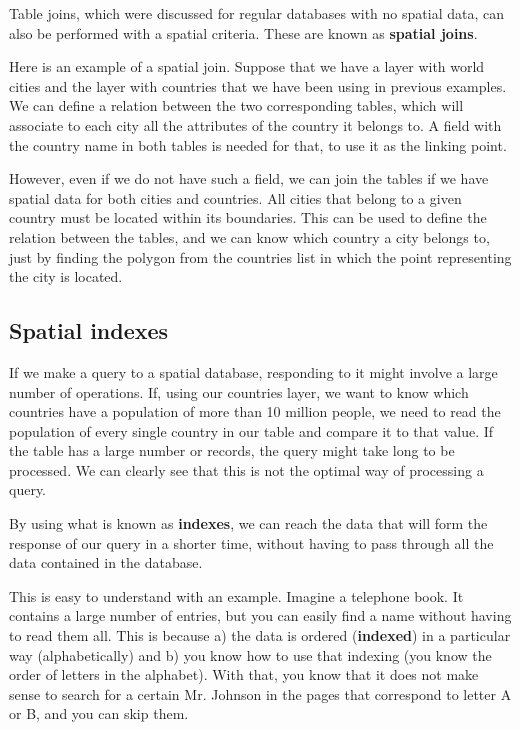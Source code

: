 Table joins, which were discussed for regular databases with no spatial data, can also be performed with a spatial criteria. These are known as \textbf{spatial joins}.

Here is an example of a spatial join. Suppose that we have a layer with world cities and the layer with countries that we have been using in previous examples. We can define a relation between the two corresponding tables, which will associate to each city all the attributes of the country it belongs to. A field with the country name in both tables is needed for that, to use it as the linking point. 

However, even if we do not have such a field, we can join the tables if we have spatial data for both cities and countries. All cities that belong to a given country must be located within its boundaries. This can be used to define the relation between the tables, and we can know which country a city belongs to, just by finding the polygon from the countries list in which the point representing the city is located.


\subsection{Spatial indexes}

If we make a query to a spatial database, responding to it might involve a large number of operations. If, using our countries layer, we want to know which countries have a population of more than 10 million people, we need to read the population of every single country in our table and compare it to that value. If the table has a large number or records, the query might take long to be processed. We can clearly see that this is not the optimal way of processing a query.

By using what is known as \textbf{indexes}, we can reach the data that will form the response of our query in a shorter time, without having to pass through all the data contained in the database.

This is easy to understand with an example. Imagine a telephone book. It contains a large number of entries, but you can easily find a name without having to read them all. This is because a) the data is ordered (\textbf{indexed}) in a particular way (alphabetically) and b) you know how to use that indexing (you know the order of letters in the alphabet). With that, you know that it does not make sense to search for a certain Mr. Johnson in the pages that correspond to letter A or B, and you can skip them.  

